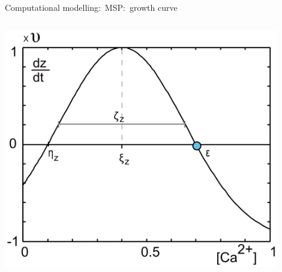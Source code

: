 \begin{frame}[c]{Computational modelling:\ MSP:\ growth curve}
\begin{columns}
\begin{column}{0.5\textwidth}
      \includegraphics[width=0.9\textwidth]{99_images/growth-curve-general.png}%
    \end{column}
  \end{columns}
\end{frame}
